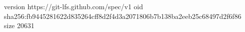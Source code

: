 version https://git-lfs.github.com/spec/v1
oid sha256:fb9445281622d835264cff8d2f4d3a2071806b7b138ba2eeb25c68497d2f6f86
size 20631
